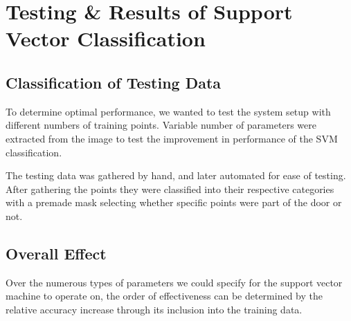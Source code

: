\chapter {Testing \& Results of Support Vector Classification}

\section{Classification of Testing Data}
To determine optimal performance, we wanted to test the system setup with different numbers of training points. Variable number of parameters were extracted from the image to test the improvement in performance of the SVM classification.

The testing data was gathered by hand, and later automated for ease of testing. After gathering the points they were classified into their respective categories with a premade mask selecting whether specific points were part of the door or not.

\section{Overall Effect}

Over the numerous types of parameters we could specify for the support vector machine to operate on, the order of effectiveness can be determined by the relative accuracy increase through its inclusion into the training data.


